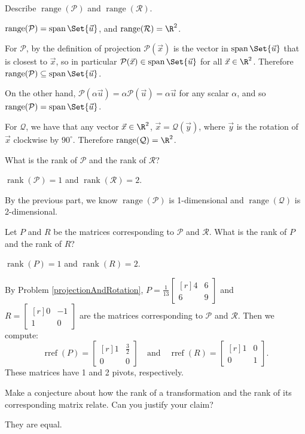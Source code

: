 \documentclass{problemset}
\DeclareMathOperator{\Span}{span}
\DeclareMathOperator{\Range}{range}
\DeclareMathOperator{\Rref}{rref}
\DeclareMathOperator{\Rank}{rank}
\newcommand{\rref}{\Rref}
\newcommand{\mat}[1]{\begin{bmatrix*}[r]#1\end{bmatrix*}}
\begin{document}
	\begin{parts}
		\item Describe $\Range(\mathcal P)$ and $\Range(\mathcal R)$.
			\begin{solution}
				$\Range(\mathcal P)=\Span\Set{\vec u}$, and $\Range(\mathcal R)=\R^2$.

				For $\mathcal P$, by the definition of projection $\mathcal P(\vec x)$
				is the vector in $\Span\Set{\vec u}$ that is closest to $\vec x$,
				so in particular $\mathcal P(\vec x) \in \Span\Set{\vec u}$ for
				all $\vec x\in\R^2$. Therefore $\Range(\mathcal P)\subseteq\Span\Set{\vec u}$.

				On the other hand, $\mathcal P(\alpha \vec u)=\alpha\mathcal P(\vec u)=\alpha\vec u$
				for any scalar $\alpha$, and so $\Range(\mathcal P)=\Span\Set{\vec u}$.

				For $\mathcal Q$, we have that any vector $\vec x\in\R^2$,
				$\vec x=\mathcal Q(\vec y)$, where $\vec y$ is the rotation of
				$\vec x$ clockwise by $90^\circ$. Therefore $\Range(\mathcal Q)=\R^2$.
			\end{solution}
		\item What is the rank of $\mathcal P$ and the rank of $\mathcal R$?
			\begin{solution}
				$\Rank(\mathcal P)=1$ and $\Rank(\mathcal R)=2$.

				By the previous part, we know $\Range(\mathcal P)$ is 1-dimensional
				and $\Range(\mathcal Q)$ is 2-dimensional.
			\end{solution}
		\item Let $P$ and $R$ be the matrices corresponding to $\mathcal P$ and
			$\mathcal R$. What is the rank of $P$ and the rank of $R$?
			\begin{solution}
				$\Rank(P)=1$ and $\Rank(R)=2$.

				By Problem \ref{projectionAndRotation}, $P=\frac{1}{13}\mat{4&6\\6&9}$
				and $R=\mat{0&-1\\1&0}$ are the	matrices corresponding to
				$\mathcal P$ and $\mathcal R$. Then we compute:
				\[
					\rref(P)=\mat{1&\frac{3}{2}\\0&0}
					\quad \text{and} \quad
					\rref(R)=\mat{1&0\\0&1}.
				\]
				These matrices have 1 and 2 pivots, respectively.
			\end{solution}
		\item Make a conjecture about how the rank of a transformation and the
			rank of its corresponding matrix relate. Can you justify your claim?
			\label{rankOfMatricesAndTransformations.4}
			\begin{solution}
				They are equal.


\end{solution}
\end{parts}
\end{document}
